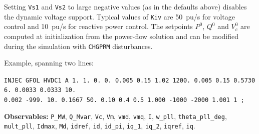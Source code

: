 \documentclass[11pt,a4paper]{article}
\begin{document}
Setting {\tt Vs1} and {\tt Vs2} to large negative values (as in the
defaults above) disables the dynamic voltage support. Typical values of
{\tt Kiv} are 50~pu/s for voltage control and 10~pu/s for reactive power
control. The setpoints $P^0$, $Q^0$ and $V_c^0$ are computed at
initialization from the power-flow solution and can be modified during the
simulation with {\tt CHGPRM} disturbances.

Example, spanning two lines:

{\tt INJEC GFOL HVDC1 A 1. 1. 0. 0. 0.005 0.15 1.02 1200. 0.005 0.15 0.5730
6. 0.0033 0.0333 10. \\
0.002 -999. 10. 0.1667 50. 0.10 0.4 0.5 1.000 -1000 -2000 1.001 1 ;}

{\bf Observables:} {\tt P\_MW}, {\tt Q\_Mvar}, {\tt Vc}, {\tt Vm},
{\tt vmd}, {\tt vmq}, {\tt I}, {\tt w\_pll}, {\tt theta\_pll\_deg},
{\tt mult\_pll}, {\tt Idmax}, {\tt Md}, {\tt idref}, {\tt id}, {\tt id\_pi},
{\tt iq\_1}, {\tt iq\_2}, {\tt iqref}, {\tt iq}.
\end{document}

